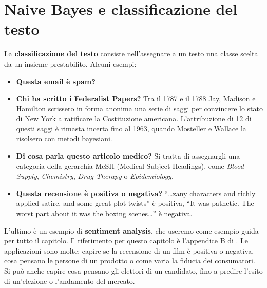 \chapter{Naive Bayes e classificazione del testo}\label{ch:nb}
La \textbf{classificazione del testo} consiste nell'assegnare a un testo una classe scelta da un insieme prestabilito. Alcuni esempi:
\begin{itemize}
    \item \textbf{Questa email è spam?}
    \item \textbf{Chi ha scritto i Federalist Papers?} Tra il 1787 e il 1788 Jay, Madison e Hamilton scrissero in forma anonima una serie di saggi per convincere lo stato di New York a ratificare la Costituzione americana. L'attribuzione di 12 di questi saggi è rimasta incerta fino al 1963, quando Mosteller e Wallace \cite{mosteller1963} la risolsero con metodi bayesiani.
    \item \textbf{Di cosa parla questo articolo medico?} Si tratta di assegnargli una categoria della gerarchia MeSH (Medical Subject Headings), come \textit{Blood Supply}, \textit{Chemistry}, \textit{Drug Therapy} o \textit{Epidemiology}.
    \item \textbf{Questa recensione è positiva o negativa?} \enquote{\dots zany characters and richly applied satire, and some great plot twists} è positiva, \enquote{It was pathetic. The worst part about it was the boxing scenes\dots} è negativa.
\end{itemize}
L'ultimo è un esempio di \textbf{sentiment analysis}, che useremo come esempio guida per tutto il capitolo. Il riferimento per questo capitolo è l'appendice B di \cite{jurafsky2026slp}. Le applicazioni sono molte: capire se la recensione di un film è positiva o negativa, cosa pensano le persone di un prodotto o come varia la fiducia dei consumatori. Si può anche capire cosa pensano gli elettori di un candidato, fino a predire l'esito di un'elezione o l'andamento del mercato.

